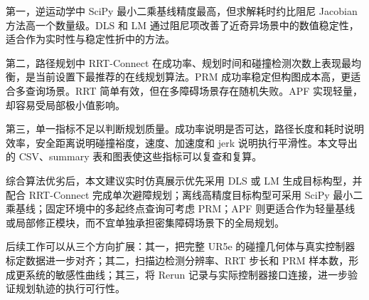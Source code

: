 \documentclass[UTF8,zihao=-4]{ctexart}
\begin{document}
第一，逆运动学中 SciPy 最小二乘基线精度最高，但求解耗时约比阻尼 Jacobian 方法高一个数量级。DLS 和 LM 通过阻尼项改善了近奇异场景中的数值稳定性，适合作为实时性与稳定性折中的方法。

第二，路径规划中 RRT-Connect 在成功率、规划时间和碰撞检测次数上表现最均衡，是当前设置下最推荐的在线规划算法。PRM 成功率稳定但构图成本高，更适合多查询场景。RRT 简单有效，但在多障碍场景存在随机失败。APF 实现轻量，却容易受局部极小值影响。

第三，单一指标不足以判断规划质量。成功率说明是否可达，路径长度和耗时说明效率，安全距离说明碰撞裕度，速度、加速度和 jerk 说明执行平滑性。本文导出的 CSV、summary 表和图表使这些指标可以复查和复算。

综合算法优劣后，本文建议实时仿真展示优先采用 DLS 或 LM 生成目标构型，并配合 RRT-Connect 完成单次避障规划；离线高精度目标构型可采用 SciPy 最小二乘基线；固定环境中的多起终点查询可考虑 PRM；APF 则更适合作为轻量基线或局部修正模块，而不宜单独承担密集障碍场景下的全局规划。

后续工作可以从三个方向扩展：其一，把完整 UR5e 的碰撞几何体与真实控制器标定数据进一步对齐；其二，扫描边检测分辨率、RRT 步长和 PRM 样本数，形成更系统的敏感性曲线；其三，将 Rerun 记录与实际控制器接口连接，进一步验证规划轨迹的执行可行性。

\renewcommand{\refname}{参考文献}


\end{document}

